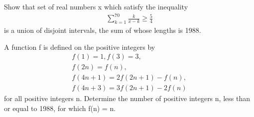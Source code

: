 \item Show that set of real numbers x which satisfy the inequality
\begin{align*}
\sum_{k=1}^{70} \frac{k}{x-k} \geq \frac{5}{4}
\end{align*}
is a union of disjoint intervals, the sum of whose lengths is 1988.

\item A function f is defined on the positive integers by
\begin{align*}
f(1) = 1, f(3) = 3,\\
f(2n) = f(n),\\
f(4n + 1) = 2f(2n + 1) - f(n),\\
f(4n + 3) = 3f(2n + 1) - 2f(n)
\end{align*}
for all positive integers n.
Determine the number of positive integers n, less than or equal to 1988, for which f(n) = n.








